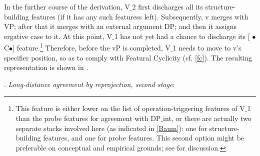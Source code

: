 \documentclass[output=paper
,modfonts
,nonflat]{langsci/langscibook}
\begin{document}
 In the further course of the derivation, V$\_$2 first discharges all its
 structure-building features (if it has any such featuress
 left). Subsequently, v merges with VP; after that it merges 
 with an external argument DP; and then it assigns ergative case to it. At
 this point, V$\_$1 has not yet had a chance to discharge its [{\small
    $\bullet$}C{\small $\bullet$}] feature.\footnote{This
   feature is either lower on the list of operation-triggering
   features of V$\_$1 than the probe features for agreement with
   DP$\_${int}, or there are actually two separate stacks involved here
   (as indicated in \ref{Baum}):
   one for structure-building features, and one for probe
   features. This second option might be preferable on conceptual and empirical
   grounds; see \cite{Mueller:04:arg,Mueller:09:eao} for discussion.}
  Therefore, before
 the vP is completed, V$\_$1 needs to move to v's specifier position, so
 as to comply with Featural Cyclicity (cf. \ref{fc}). The resulting
 representation is shown in \Next.

\Lsciex. {\it Long-distance agreement \label{Baum2}by reprojection, second
stage}:\\
\end{document}
